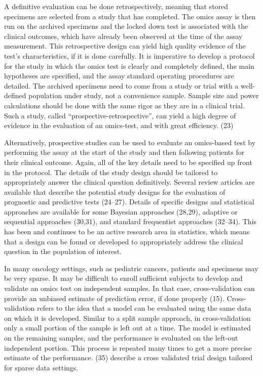 \documentclass[11pt]{article}
\begin{document}
A definitive evaluation can be done retrospectively, meaning that stored
specimens are selected from a study that has completed. The omics assay
is then run on the archived specimens and the locked down test is
associated with the clinical outcomes, which have already been observed
at the time of the assay measurement. This retrospective design can
yield high quality evidence of the test's characteristics, if it is done
carefully. It is imperative to develop a protocol for the study in which
the omics test is clearly and completely defined, the main hypotheses
are specified, and the assay standard operating procedures are detailed.
The archived specimens need to come from a study or trial with a
well-defined population under study, not a convenience sample. Sample
size and power calculations should be done with the same rigor as they
are in a clinical trial. Such a study, called
``prospective-retrospective'', can yield a high degree of evidence in
the evaluation of an omics-test, and with great efficiency. (23)

Alternatively, prospective studies can be used to evaluate an
omics-based test by performing the assay at the start of the study and
then following patients for their clinical outcome. Again, all of the
key details need to be specified up front in the protocol. The details
of the study design should be tailored to appropriately answer the
clinical question definitively. Several review articles are available
that describe the potential study designs for the evaluation of
prognostic and predictive tests (24--27). Details of specific designs
and statistical approaches are available for some Bayesian approaches
(28,29), adaptive or sequential approaches (30,31), and standard
frequentist approaches (32--34). This has been and continues to be an
active research area in statistics, which means that a design can be
found or developed to appropriately address the clinical question in the
population of interest.

In many oncology settings, such as pediatric cancers, patients and
specimens may be very sparse. It may be difficult to enroll sufficient
subjects to develop and validate an omics test on independent samples.
In that case, cross-validation can provide an unbiased estimate of
prediction error, if done properly (15). Cross-validation refers to the
idea that a model can be evaluated using the same data on which it is
developed. Similar to a split sample approach, in cross-validation only
a small portion of the sample is left out at a time. The model is
estimated on the remaining samples, and the performance is evaluated on
the left-out independent portion. This process is repeated many times to
get a more precise estimate of the performance. (35) describe a cross
validated trial design tailored for sparse data settings.
\end{document}
